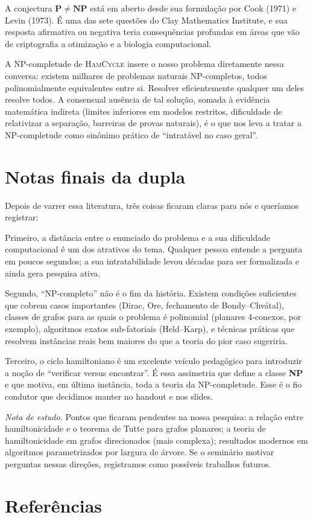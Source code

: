 \documentclass[11pt,a4paper]{article}
\theoremstyle{definition}
\newcommand{\nota}[1]{%
  \par\medskip
  {\small\color{notagray}\textit{Nota de estudo.} #1}\par\medskip
}
\begin{document}
A conjectura $\mathbf{P} \neq \mathbf{NP}$ está em aberto desde sua formulação por Cook (1971) e Levin (1973). É uma das sete questões do Clay Mathematics Institute, e sua resposta afirmativa ou negativa teria consequências profundas em áreas que vão de criptografia a otimização e a biologia computacional.

A NP-completude de \textsc{HamCycle} insere o nosso problema diretamente nessa conversa: existem milhares de problemas naturais NP-completos, todos polinomialmente equivalentes entre si. Resolver eficientemente qualquer um deles resolve todos. A consensual ausência de tal solução, somada à evidência matemática indireta (limites inferiores em modelos restritos, dificuldade de relativizar a separação, barreiras de provas naturais), é o que nos leva a tratar a NP-completude como sinônimo prático de ``intratável no caso geral''.

\section{Notas finais da dupla}

Depois de varrer essa literatura, três coisas ficaram claras para nós e queríamos registrar:

Primeiro, a distância entre o enunciado do problema e a sua dificuldade computacional é um dos atrativos do tema. Qualquer pessoa entende a pergunta em poucos segundos; a sua intratabilidade levou décadas para ser formalizada e ainda gera pesquisa ativa.

Segundo, ``NP-completo'' não é o fim da história. Existem condições suficientes que cobrem casos importantes (Dirac, Ore, fechamento de Bondy--Chvátal), classes de grafos para as quais o problema é polinomial (planares 4-conexos, por exemplo), algoritmos exatos sub-fatoriais (Held--Karp), e técnicas práticas que resolvem instâncias reais bem maiores do que a teoria do pior caso sugeriria.

Terceiro, o ciclo hamiltoniano é um excelente veículo pedagógico para introduzir a noção de ``verificar versus encontrar''. É essa assimetria que define a classe \textbf{NP} e que motiva, em última instância, toda a teoria da NP-completude. Esse é o fio condutor que decidimos manter no handout e nos slides.

\nota{Pontos que ficaram pendentes na nossa pesquisa: a relação entre hamiltonicidade e o teorema de Tutte para grafos planares; a teoria de hamiltonicidade em grafos direcionados (mais complexa); resultados modernos em algoritmos parametrizados por largura de árvore. Se o seminário motivar perguntas nessas direções, registramos como possíveis trabalhos futuros.}

\section*{Referências}
\renewcommand{\bibsection}{}


\end{document}
